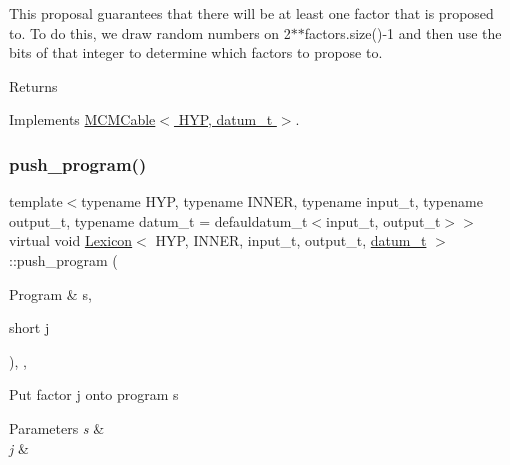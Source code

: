 This proposal guarantees that there will be at least one factor that is proposed to. To do this, we draw random numbers on 2$\ast$$\ast$factors.size()-\/1 and then use the bits of that integer to determine which factors to propose to. \begin{DoxyReturn}{Returns}

\end{DoxyReturn}


Implements \hyperlink{class_m_c_m_cable_ab119a14256ab92c5c1e941f8492df830}{M\+C\+M\+Cable$<$ H\+Y\+P, datum\+\_\+t $>$}.

\mbox{\label{class_lexicon_acd367c70ccc583f2a9fcbb1d007db45c}} 
\subsubsection{\texorpdfstring{push\+\_\+program()}{push\_program()}}
{\footnotesize\ttfamily template$<$typename H\+YP, typename I\+N\+N\+ER, typename input\+\_\+t, typename output\+\_\+t, typename datum\+\_\+t = defauldatum\+\_\+t$<$input\+\_\+t, output\+\_\+t$>$$>$ \\
virtual void \hyperlink{class_lexicon}{Lexicon}$<$ H\+YP, I\+N\+N\+ER, input\+\_\+t, output\+\_\+t, \hyperlink{class_bayesable_a9f1a6c0cd7855550fa10b1a8f13a5867}{datum\+\_\+t} $>$\+::push\+\_\+program (\begin{DoxyParamCaption}\item[{Program \&}]{s,  }\item[{short}]{j }\end{DoxyParamCaption})\hspace{0.3cm}{\ttfamily [inline]}, {\ttfamily [override]}, {\ttfamily [virtual]}}

Put factor j onto program s 
\begin{DoxyParams}{Parameters}
{\em s} & \\
\hline
{\em j} & \\
\hline
\end{DoxyParams}
\mbox{\label{class_lexicon_ac8577ba9b4554ebf1852020c617bd7df}} 
